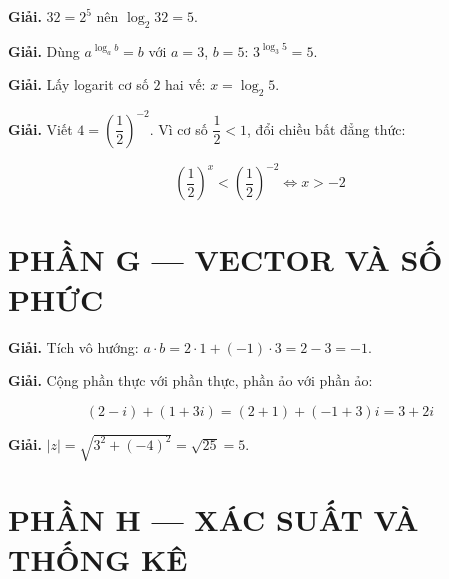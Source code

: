 \documentclass[11pt, a4paper]{article}
\begin{document}
\vspace{0.3cm}
\begin{dapan}[37 — Đáp án B]

\textbf{Giải.} $32 = 2^5$ nên $\log_2 32 = 5$.


\end{dapan}
\vspace{0.3cm}
\begin{dapan}[38 — Đáp án B]

\textbf{Giải.} Dùng $a^{\log_a b} = b$ với $a = 3$, $b = 5$: $3^{\log_3 5} = 5$.


\end{dapan}
\vspace{0.3cm}
\begin{dapan}[39 — Đáp án C]

\textbf{Giải.} Lấy logarit cơ số $2$ hai vế: $x = \log_2 5$.


\end{dapan}
\vspace{0.3cm}
\begin{dapan}[40 — Đáp án B]

\textbf{Giải.} Viết $4 = \left(\dfrac{1}{2}\right)^{-2}$. Vì cơ số $\dfrac{1}{2} < 1$, đổi chiều bất đẳng thức:

$$\left(\dfrac{1}{2}\right)^x < \left(\dfrac{1}{2}\right)^{-2} \iff x > -2$$

\section{PHẦN G — VECTOR VÀ SỐ PHỨC}


\end{dapan}
\vspace{0.3cm}
\begin{dapan}[41 — Đáp án C]

\textbf{Giải.} Tích vô hướng: $a \cdot b = 2 \cdot 1 + (-1) \cdot 3 = 2 - 3 = -1$.


\end{dapan}
\vspace{0.3cm}
\begin{dapan}[42 — Đáp án B]

\textbf{Giải.} Cộng phần thực với phần thực, phần ảo với phần ảo:

$$(2 - i) + (1 + 3i) = (2 + 1) + (-1 + 3)i = 3 + 2i$$


\end{dapan}
\vspace{0.3cm}
\begin{dapan}[43 — Đáp án A]

\textbf{Giải.} $\lvert z \rvert = \sqrt{3^2 + (-4)^2} = \sqrt{25} = 5$.

\section{PHẦN H — XÁC SUẤT VÀ THỐNG KÊ}


\end{dapan}
\end{document}
